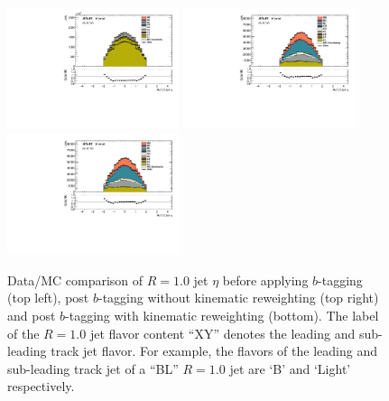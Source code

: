 \begin{figure}[htbp]
  \centering
 \includegraphics[width=0.45\textwidth]{figures/gbb/LargeRJet_eta_NoReweight.pdf}
 \includegraphics[width=0.45\textwidth]{figures/gbb/LargeRJet_eta_PreReweight.pdf}\\
 \includegraphics[width=0.45\textwidth]{figures/gbb/LargeRJet_eta_Reweight.pdf}
\caption{Data/MC comparison of $R=1.0$ jet $\eta$ before applying $b$-tagging (top left), post $b$-tagging without kinematic reweighting (top right) and post $b$-tagging with kinematic reweighting (bottom). The label of the $R=1.0$ jet flavor content ``XY'' denotes the leading and sub-leading track jet flavor. For example, the flavors of the leading and sub-leading track jet of a ``BL'' $R=1.0$ jet are `B' and `Light' respectively.}
  \label{fig:gbb-eta_largeR}
\end{figure}



